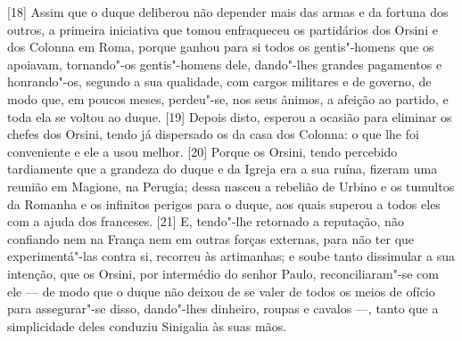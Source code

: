 {[}18{]} Assim que o duque deliberou não depender mais das armas e da
fortuna dos outros, a primeira iniciativa que tomou enfraqueceu os
partidários dos Orsini e dos Colonna em Roma, porque ganhou para si
todos os gentis"-homens que os apoiavam, tornando"-os gentis"-homens dele, dando"-lhes
grandes pagamentos e honrando"-os, segundo a sua qualidade, com
cargos militares e de governo, de modo que, em poucos meses,
perdeu"-se, nos seus ânimos, a afeição ao partido, e toda ela se voltou
ao duque. {[}19{]} Depois disto, esperou a ocasião para eliminar os
chefes dos Orsini, tendo já dispersado os da casa dos Colonna: o que lhe
foi conveniente e ele a usou melhor. {[}20{]} Porque os Orsini, tendo
percebido tardiamente que a grandeza do duque e da Igreja era a sua
ruína, fizeram uma reunião em Magione, na
Perugia; dessa nasceu a rebelião de Urbino e os tumultos da Romanha e os
infinitos perigos para o duque, aos quais superou a todos eles com a
ajuda dos franceses. {[}21{]} E, tendo"-lhe retornado a reputação, não confiando nem na França nem em
outras forças externas, para não ter que experimentá"-las contra si,
recorreu às artimanhas; e soube tanto dissimular a sua intenção, que os
Orsini, por intermédio do senhor Paulo, reconciliaram"-se com ele --- de
modo que o duque não deixou de se valer de todos os meios de ofício para
assegurar"-se disso, dando"-lhes dinheiro, roupas e cavalos ---, tanto que
a simplicidade
deles conduziu Sinigalia às suas mãos.

